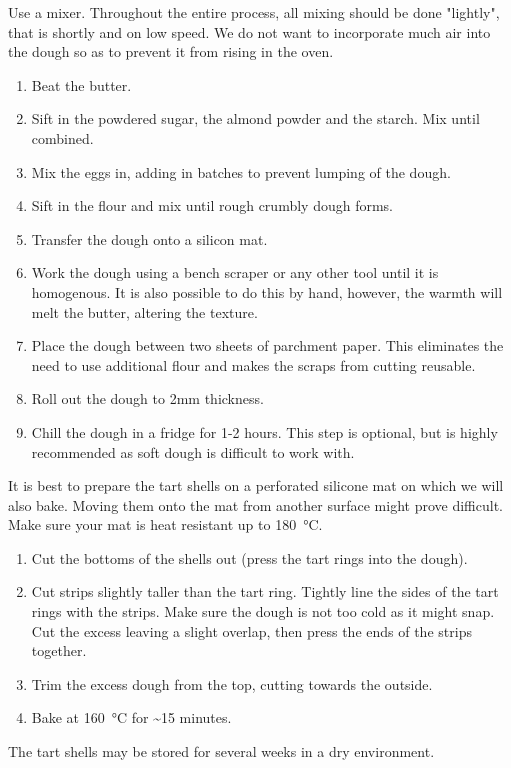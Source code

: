 Use a mixer. Throughout the entire process, all mixing should be done "lightly",
that is shortly and on low speed. We do not want to incorporate much air into
the dough so as to prevent it from rising in the oven.
\begin{enumerate}
  \item Beat the butter.
  \item Sift in the powdered sugar, the almond powder and the starch. Mix until
  combined.
  \item Mix the eggs in, adding in batches to prevent lumping of the dough.
  \item Sift in the flour and mix until rough crumbly dough forms.
  \item Transfer the dough onto a silicon mat.
  \item Work the dough using a bench scraper or any other tool until it is
  homogenous. It is also possible to do this by hand, however, the warmth will
  melt the butter, altering the texture.
  \item Place the dough between two sheets of parchment paper. This eliminates
  the need to use additional flour and makes the scraps from cutting reusable.
  \item Roll out the dough to 2mm thickness.
  \item Chill the dough in a fridge for 1-2 hours. This step is optional, but
  is highly recommended as soft dough is difficult to work with.
  \saveenum
\end{enumerate}
It is best to prepare the tart shells on a perforated silicone mat on which we
will also bake. Moving them onto the mat from another surface might prove
difficult. Make sure your mat is heat resistant up to \SI{180}{\celsius}.
\begin{enumerate}
  \contenum
  \item Cut the bottoms of the shells out (press the tart rings into the dough).
  \item Cut strips slightly taller than the tart ring. Tightly line the sides
  of the tart rings with the strips. Make sure the dough is not too cold as it
  might snap. Cut the excess leaving a slight overlap, then press the ends of
  the strips together.
  \item Trim the excess dough from the top, cutting towards the outside.
  \item Bake at \SI{160}{\celsius} for \textasciitilde 15 minutes.
\end{enumerate}
The tart shells may be stored for several weeks in a dry environment.

